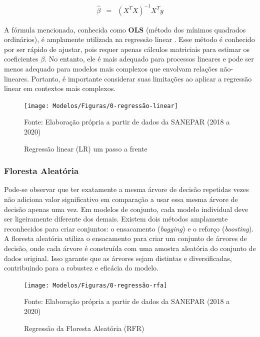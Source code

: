 \begin{eqnarray}
	\hat{\beta}&=&\left(X^T X\right)^{-1} X^T y\label{eq:ols}
\end{eqnarray}

A fórmula mencionada, conhecida como \textbf{OLS} (método dos mínimos quadrados ordinários), é amplamente utilizada na regressão linear . Esse método é conhecido por ser rápido de ajustar, pois requer apenas cálculos matriciais para estimar os coeficientes $\beta$. No entanto, ele é mais adequado para processos lineares e pode ser menos adequado para modelos mais complexos que envolvam relações não-lineares. Portanto, é importante considerar suas limitações ao aplicar a regressão linear em contextos mais complexos.

\begin{figure}[H]
	\centering
	\caption{Regressão linear (LR) um passo a frente}
	\label{fig:1-regressao-linear}
	\texttt{[image: Modelos/Figuras/0-regressão-linear]}
	
	Fonte: Elaboração própria a partir de dados da SANEPAR (2018 a 2020)
\end{figure}


\subsubsection{Floresta Aleat\'oria} \label{subsubsec:rf}

Pode-se observar que ter exatamente a mesma árvore de decisão repetidas vezes não adiciona valor significativo em comparação a usar essa mesma árvore de decisão apenas uma vez. Em modelos de conjunto, cada modelo individual deve ser ligeiramente diferente dos demais. Existem dois métodos amplamente reconhecidos para criar conjuntos: o ensacamento (\textit{bagging}) e o reforço (\textit{boosting}). A floresta aleatória utiliza o ensacamento para criar um conjunto de árvores de decisão, onde cada árvore é construída com uma amostra aleatória do conjunto de dados original. Isso garante que as árvores sejam distintas e diversificadas, contribuindo para a robustez e eficácia do modelo.


\begin{figure}[H]
	\centering
	\caption{Regressão da Floresta Aleatória (RFR)}
	\label{fig:1-regressao-rfa}
	\texttt{[image: Modelos/Figuras/0-regressão-rfa]}
	
	Fonte: Elaboração própria a partir de dados da SANEPAR (2018 a 2020)
\end{figure}


